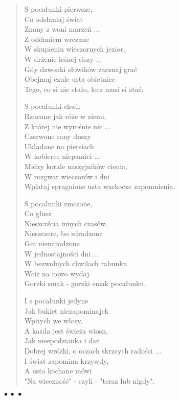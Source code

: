 \documentclass{article} %
\newenvironment{wiersz}[1]
	{\begin{verse} \hspace*{-1em}{\bf #1}}
	{\end{verse} \begin{center}$\bullet\ \bullet\ \bullet$\end{center}}
\newcommand{\e}{\eob}
\renewcommand{\a}{\aob}
\renewcommand{\o}{\'{o}}
\newcommand{\n}{\'{n}}
\newcommand{\s}{\'{s}}
\newcommand{\ci}{\'{c}}
\begin{document}
\begin{wiersz} {Poca{\l}unki \\*[1ex]}
S{\a} poca{\l}unki pierwsze, \\ 
Co ods{\l}aniaj{\a} {\s}wiat \\ 
Znany z woni marze{\n} ... \\ 
Z oddaniem wr{\e}czane  \\ 
W skupieniu wieczornych jezior, \\ 
W dr\.{z}enie le{\s}nej ciszy ... \\ 
Gdy dzwonki s{\l}owik{\o}w zacznaj{\a} gra{\ci} \\ 
Obejmuj{\a} czule usta obietnice \\ 
Tego, co si{\e} nie sta{\l}o, lecz musi si{\e} sta{\ci}. 
 
S{\a} poca{\l}unki chwil \\ 
Rzucane jak r{\o}\.{z}e w ziemi{\e}, \\ 
Z kt{\o}rej nie wyro{\s}nie nic ... \\ 
Czerwone rany duszy \\ 
Uk{\l}adane na piersiach \\ 
W kobierce niepami{\e}ci ... \\ 
Mi{\e}dzy korale naszyjnik{\o}w cienia,  \\ 
W rozgwar wieczor{\o}w i dni  \\ 
Wplataj{\a} spragnione usta warkocze zapomnienia. 

S{\a} poca{\l}unki zm{\e}czone, \\ 
Co g{\l}usz{\a} \\ 
Nieszcz{\e}{\s}cia innych czas{\o}w. \\ 
Nieszczere, bo zdradzone \\ 
Gin{\a} nienarodzone \\ 
W jednostajno{\s}ci dni ... \\ 
W bezwolnych chwilach rabunku \\ 
Wci{\a}\.{z} na nowo wydaj{\a} \\ 
Gorzki smak - gorzki smak poca{\l}unku. 

I s{\a} poca{\l}unki jedyne \\ 
Jak bukiet niezapominajek  \\ 
Wpi{\e}tych we w{\l}osy. \\ 
A ka\.{z}da jest {\s}wie\.{z}a wiosn{\a}, \\ 
Jak niespodzianka i dar \\ 
Dobrej wr{\o}\.{z}ki, o oczach skrz{\a}cych rado{\s}ci{\a} ... \\ 
I {\s}wiat zapomina krzywdy, \\ 
A usta kochane m{\o}wi{\a} \\ 
"Na wieczno{\s}{\ci}" - czyli - "teraz lub nigdy".

\end{wiersz}
\end{document}
